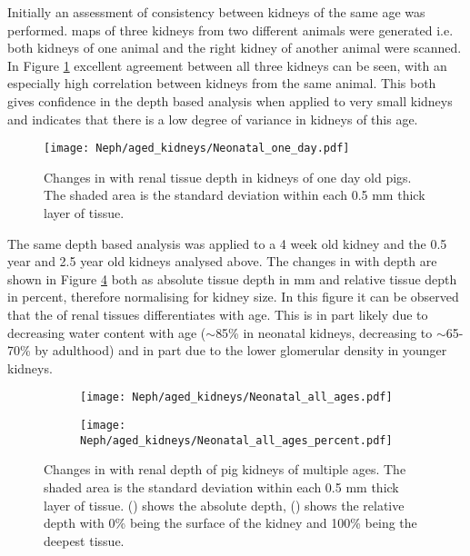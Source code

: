Initially an assessment of consistency between kidneys of the same age was performed. \tone maps of three kidneys from two different animals were generated i.e. both kidneys of one animal and the right kidney of another animal were scanned. In Figure \ref{fig:ex_neo_layers_one_day} excellent agreement between all three kidneys can be seen, with an especially high correlation between kidneys from the same animal. This both gives confidence in the depth based analysis when applied to very small kidneys and indicates that there is a low degree of variance in kidneys of this age.

\begin{figure}[H]
	\centering
	\texttt{[image: Neph/aged\_kidneys/Neonatal\_one\_day.pdf]}
	\caption{Changes in \tone with renal tissue depth in kidneys of one day old pigs. The shaded area is the standard deviation within each 0.5 mm thick layer of tissue.}
	\label{fig:ex_neo_layers_one_day}	
\end{figure}

The same depth based analysis was applied to a 4 week old kidney and the 0.5 year and 2.5 year old kidneys analysed above. The changes in \tone with depth are shown in Figure \ref{fig:ex_neo_layers_all_ages} both as absolute tissue depth in mm and relative tissue depth in percent, therefore normalising for kidney size. In this figure it can be observed that the \tone of renal tissues differentiates with age. This is in part likely due to decreasing water content with age ($\sim$85\% in neonatal kidneys, decreasing to $\sim$65-70\% by adulthood) and in part due to the lower glomerular density in younger kidneys.

\begin{figure}[H]
	\centering
	\begin{subfigure}[c]{0.47\textwidth}
		\centering
		\texttt{[image: Neph/aged\_kidneys/Neonatal\_all\_ages.pdf]}
		\caption{}
		\label{fig:ex_neo_layers_all_ages_abs}
	\end{subfigure}
	\hfill
	\begin{subfigure}[c]{0.47\textwidth}
		\centering
		\texttt{[image: Neph/aged\_kidneys/Neonatal\_all\_ages\_percent.pdf]}
		\caption{}
		\label{fig:ex_neo_layers_all_ages_per}
	\end{subfigure}
	\caption{Changes in \tone with renal depth of pig kidneys of multiple ages. The shaded area is the standard deviation within each 0.5 mm thick layer of tissue. () shows the absolute depth, () shows the relative depth with 0\% being the surface of the kidney and 100\% being the deepest tissue.}
	\label{fig:ex_neo_layers_all_ages}
\end{figure}

